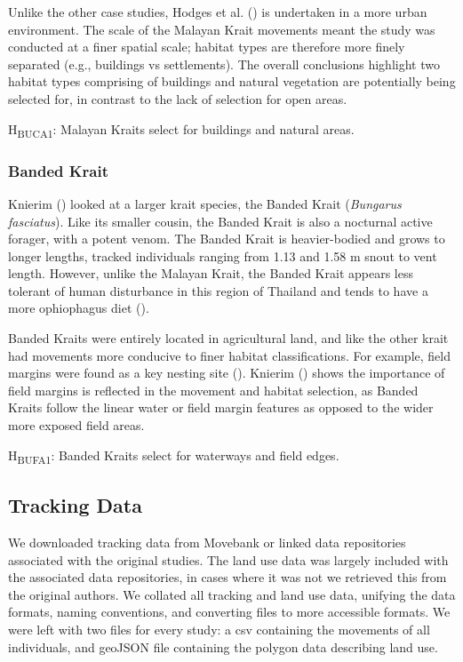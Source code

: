 \documentclass[10pt,a4paper]{article}
\begin{document}
Unlike the other case studies, Hodges et al. () is undertaken in a more urban environment.
The scale of the Malayan Krait movements meant the study was conducted at a finer spatial scale; habitat types are therefore more finely separated (e.g., buildings vs settlements).
The overall conclusions highlight two habitat types comprising of buildings and natural vegetation are potentially being selected for, in contrast to the lack of selection for open areas.

H\textsubscript{BUCA1}: Malayan Kraits select for buildings and natural areas.

\subsubsection{Banded Krait}\label{banded-krait}

Knierim () looked at a larger krait species, the Banded Krait (\emph{Bungarus fasciatus}).
Like its smaller cousin, the Banded Krait is also a nocturnal active forager, with a potent venom.
The Banded Krait is heavier-bodied and grows to longer lengths, tracked individuals ranging from 1.13 and 1.58 m snout to vent length.
However, unlike the Malayan Krait, the Banded Krait appears less tolerant of human disturbance in this region of Thailand and tends to have a more ophiophagus diet ().

Banded Kraits were entirely located in agricultural land, and like the other krait had movements more conducive to finer habitat classifications.
For example, field margins were found as a key nesting site ().
Knierim () shows the importance of field margins is reflected in the movement and habitat selection, as Banded Kraits follow the linear water or field margin features as opposed to the wider more exposed field areas.

H\textsubscript{BUFA1}: Banded Kraits select for waterways and field edges.

\subsection{Tracking Data}\label{tracking-data}

We downloaded tracking data from Movebank or linked data repositories associated with the original studies.
The land use data was largely included with the associated data repositories, in cases where it was not we retrieved this from the original authors.
We collated all tracking and land use data, unifying the data formats, naming conventions, and converting files to more accessible formats.
We were left with two files for every study: a csv containing the movements of all individuals, and geoJSON file containing the polygon data describing land use.
\end{document}
